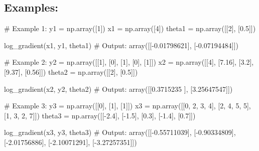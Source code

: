 \documentclass[]{article}
\newenvironment{Shaded}{\begin{snugshade}}{\end{snugshade}}
\newcommand{\CommentTok}[1]{\textcolor[rgb]{0.48,0.49,0.49}{#1}}
\newcommand{\DecValTok}[1]{\textcolor[rgb]{0.96,0.45,0.00}{#1}}
\newcommand{\FloatTok}[1]{\textcolor[rgb]{0.96,0.45,0.00}{#1}}
\newcommand{\NormalTok}[1]{\textcolor[rgb]{0.81,0.81,0.76}{#1}}
\newcommand{\OperatorTok}[1]{\textcolor[rgb]{0.81,0.81,0.76}{#1}}
\begin{document}
\hypertarget{examples-6}{%
\subsection{Examples:}\label{examples-6}}

\begin{Shaded}
\begin{Highlighting}[]
\CommentTok{# Example 1:}
\NormalTok{y1 }\OperatorTok{=}\NormalTok{ np.array([}\DecValTok{1}\NormalTok{])}
\NormalTok{x1 }\OperatorTok{=}\NormalTok{ np.array([}\DecValTok{4}\NormalTok{])}
\NormalTok{theta1 }\OperatorTok{=}\NormalTok{ np.array([[}\DecValTok{2}\NormalTok{], [}\FloatTok{0.5}\NormalTok{]])}

\NormalTok{log_gradient(x1, y1, theta1)}
\CommentTok{# Output:}
\NormalTok{array([[}\OperatorTok{-}\FloatTok{0.01798621}\NormalTok{],}
\NormalTok{       [}\OperatorTok{-}\FloatTok{0.07194484}\NormalTok{]])}

\CommentTok{# Example 2: }
\NormalTok{y2 }\OperatorTok{=}\NormalTok{ np.array([[}\DecValTok{1}\NormalTok{], [}\DecValTok{0}\NormalTok{], [}\DecValTok{1}\NormalTok{], [}\DecValTok{0}\NormalTok{], [}\DecValTok{1}\NormalTok{]])}
\NormalTok{x2 }\OperatorTok{=}\NormalTok{ np.array([[}\DecValTok{4}\NormalTok{], [}\FloatTok{7.16}\NormalTok{], [}\FloatTok{3.2}\NormalTok{], [}\FloatTok{9.37}\NormalTok{], [}\FloatTok{0.56}\NormalTok{]])}
\NormalTok{theta2 }\OperatorTok{=}\NormalTok{ np.array([[}\DecValTok{2}\NormalTok{], [}\FloatTok{0.5}\NormalTok{]])}

\NormalTok{log_gradient(x2, y2, theta2)}
\CommentTok{# Output:}
\NormalTok{array([[}\FloatTok{0.3715235}\NormalTok{ ],}
\NormalTok{       [}\FloatTok{3.25647547}\NormalTok{]])}

\CommentTok{# Example 3: }
\NormalTok{y3 }\OperatorTok{=}\NormalTok{ np.array([[}\DecValTok{0}\NormalTok{], [}\DecValTok{1}\NormalTok{], [}\DecValTok{1}\NormalTok{]])}
\NormalTok{x3 }\OperatorTok{=}\NormalTok{ np.array([[}\DecValTok{0}\NormalTok{, }\DecValTok{2}\NormalTok{, }\DecValTok{3}\NormalTok{, }\DecValTok{4}\NormalTok{], [}\DecValTok{2}\NormalTok{, }\DecValTok{4}\NormalTok{, }\DecValTok{5}\NormalTok{, }\DecValTok{5}\NormalTok{], [}\DecValTok{1}\NormalTok{, }\DecValTok{3}\NormalTok{, }\DecValTok{2}\NormalTok{, }\DecValTok{7}\NormalTok{]])}
\NormalTok{theta3 }\OperatorTok{=}\NormalTok{ np.array([[}\OperatorTok{-}\FloatTok{2.4}\NormalTok{], [}\OperatorTok{-}\FloatTok{1.5}\NormalTok{], [}\FloatTok{0.3}\NormalTok{], [}\OperatorTok{-}\FloatTok{1.4}\NormalTok{], [}\FloatTok{0.7}\NormalTok{]])}

\NormalTok{log_gradient(x3, y3, theta3)}
\CommentTok{# Output:}
\NormalTok{array([[}\OperatorTok{-}\FloatTok{0.55711039}\NormalTok{],}
\NormalTok{       [}\OperatorTok{-}\FloatTok{0.90334809}\NormalTok{],}
\NormalTok{       [}\OperatorTok{-}\FloatTok{2.01756886}\NormalTok{],}
\NormalTok{       [}\OperatorTok{-}\FloatTok{2.10071291}\NormalTok{],}
\NormalTok{       [}\OperatorTok{-}\FloatTok{3.27257351}\NormalTok{]])}
\end{Highlighting}
\end{Shaded}
\end{document}
